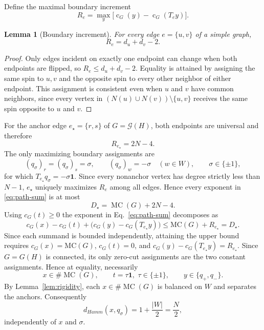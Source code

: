 \documentclass[11pt]{article}
\newtheorem{lemma}[theorem]{Lemma}
\newcommand{\Cut}{\operatorname{c}}
\newcommand{\mc}{\operatorname{MC}}
\newcommand{\M}{\#\mc}
\newcommand{\one}{\mathbf{1}}
\newcommand{\sh}[1]{{#1}}
\begin{document}
Define the maximal boundary increment
\begin{equation}
 R_e=\max_y\bigl[\Cut_G(y)-\Cut_G(T_ey)\bigr].
 \label{eq:boundary}
\end{equation}

\begin{lemma}[Boundary increment]\label{lem:boundary}
For every edge $e=\{u,v\}$ of a simple graph,
\begin{equation}
 R_e=d_u+d_v-2.
 \label{eq:boundary-value}
\end{equation}
\end{lemma}

\begin{proof}
Only edges incident on exactly one endpoint can change when both endpoints are flipped, so
$R_e\leq d_u+d_v-2$.  Equality is attained by assigning the same spin to $u,v$ and the
opposite spin to every other neighbor of either endpoint. This assignment is consistent even when \(u\) and \(v\) have common
neighbors, since every vertex in
\((N(u)\cup N(v))\setminus\{u,v\}\) receives the same spin opposite
to \(u\) and \(v\).
\end{proof}

For the anchor edge $e_\star=\{r,s\}$ of $G=\mathcal G(H)$, both endpoints are
universal and therefore
\begin{equation}
 R_{e_\star}=2N-4.
 \label{eq:Rstar}
\end{equation}
The only maximizing boundary assignments are
\begin{equation}
 (q_\sigma)_r=(q_\sigma)_s=\sigma,
 \qquad
 (q_\sigma)_w=-\sigma\quad(w\in W),
 \qquad \sigma\in\{\pm1\},
 \label{eq:q-sigma}
\end{equation}
for which $T_{e_\star}q_\sigma=-\sigma\one$.  Since every nonanchor vertex has degree
strictly less than $N-1$, $e_\star$ uniquely maximizes $R_e$ among all edges. 
Hence every exponent in \eqref{eq:path-sum} is at most
\begin{equation}
 D_\star=\mc(G)+2N-4.
 \label{eq:Dstar}
\end{equation} 
%
\sh{Using \(c_G(t)\ge0\) the exponent in Eq.~\eqref{eq:path-sum} decomposes as
\[
c_G(x)-c_G(t)
+\bigl(c_G(y)-c_G(T_{e_\star}y)\bigr)
\le
\mathrm{MC}(G)+R_{e_\star}
=
D_\star.
\]
Since each summand is bounded
independently, } %
attaining the upper bound requires $c_G(x)=\mathrm{MC}(G)$, $c_G(t)=0$, and $c_G(y)-c_G(T_{e_\star}y)=R_{e_\star}$.  Since
$G=G(H)$ is connected, its only zero-cut assignments are the two
constant assignments.  
Hence
at equality, necessarily
\begin{equation}
 x\in\M(G),
 \qquad
  t=\tau\one,\,\,\tau \in \{\pm 1\},
 \qquad
 y\in\{q_+,q_-\}.
 \label{eq:extreme-histories}
\end{equation}
By Lemma~\ref{lem:rigidity}, each $x\in\M(G)$ is balanced on $W$ and separates the anchors.
Consequently
\begin{equation}
 d_{Hamm}(x,q_\sigma)=1+\frac{|W|}{2}=\frac N2, %
 \label{eq:hamming}
\end{equation}
independently of $x$ and $\sigma$.  
\end{document}
